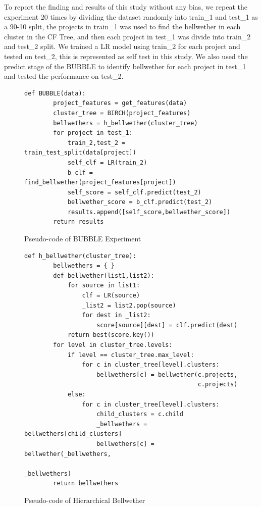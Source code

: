\documentclass[sigconf]{acmart}
\theoremstyle{break}
\begin{document}
To report the finding and results of this study without any bias, we repeat the experiment 20 times by dividing the dataset randomly into train\_1 and test\_1 as a 90-10 split, the projects in train\_1 was used to find the bellwether in each cluster in the CF Tree, and then each project in test\_1 was divide into train\_2 and test\_2 split. We trained a LR model using train\_2 for each project and tested on test\_2, this is represented as self test in this study. We also used the predict stage of the BUBBLE to identify bellwether for each project in test\_1 and tested the performance on test\_2. 


\small{
\begin{figure}[]
    \small
     \begin{lstlisting}[mathescape,linewidth=7.5cm,frame=none,numbers=right]
      def BUBBLE(data):
        project_features = get_features(data)
        cluster_tree = BIRCH(project_features)
        bellwethers = h_bellwether(cluster_tree)
        for project in test_1:
            train_2,test_2 = train_test_split(data[project])
            self_clf = LR(train_2)
            b_clf = find_bellwether(project_features[project])
            self_score = self_clf.predict(test_2)
            bellwether_score = b_clf.predict(test_2)
            results.append([self_score,bellwether_score]) 
        return results
    \end{lstlisting} 
    \vspace{-0.2cm}
    \caption{Pseudo-code of BUBBLE Experiment}
    \label{fig:GAP_pseudocode} 
    \vspace{-0.3cm}
\end{figure}
}

\small{
\begin{figure}[]
    \small
     \begin{lstlisting}[mathescape,linewidth=7.5cm,frame=none,numbers=right]
      def h_bellwether(cluster_tree):
        bellwethers = { }
        def bellwether(list1,list2):
            for source in list1:
                clf = LR(source)
                _list2 = list2.pop(source)
                for dest in _list2:
                    score[source][dest] = clf.predict(dest)
            return best(score.key())
        for level in cluster_tree.levels:
            if level == cluster_tree.max_level:
                for c in cluster_tree[level].clusters:
                    bellwethers[c] = bellwether(c.projects,
                                                c.projects)
            else:
                for c in cluster_tree[level].clusters:
                    child_clusters = c.child
                    _bellwethers = bellwethers[child_clusters]
                    bellwethers[c] = bellwether(_bellwethers,
                                                _bellwethers)
        return bellwethers
    \end{lstlisting} 
    \vspace{-0.2cm}
    \caption{Pseudo-code of Hierarchical Bellwether}
    \label{fig:GAP_pseudocode} 
    \vspace{-0.3cm}
\end{figure}
}
\end{document}
